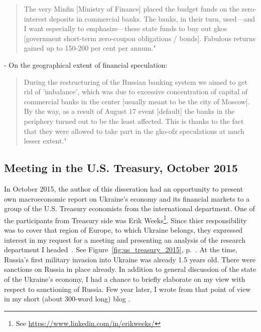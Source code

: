 \begin{quote}
The very Minfin [Ministry of Finance] placed the budget funds on the zero-interest deposits in commercial banks. The banks, in their turn, used---and I want especially to emphasize---these state funds to buy out \acp{gko} [government short-term zero-coupon obligations / bonds]. Fabulous returns gained up to 150-200 per cent per annum." \citep[p.~27]{primakov2002}
\end{quote}

- On the geographical extent of financial speculation:

\begin{quote}
During the restructuring of the Russian banking system we aimed to get rid of 'imbalance', which was due to excessive concentration of capital of commercial banks in the center [usually meant to be the city of Moscow]. By the way, as a result of August 17 event [default] the banks in the periphery turned out to be the least affected. This is thanks to the fact that they were allowed to take part in the \ac{gko}-\ac{ofz} speculations at much lesser extent." \citep[p.~53]{primakov2002}
\end{quote}

\subsection{Meeting in the U.S. Treasury, October 2015}

In October 2015, the author of this disseration had an opportunity to present own macroeconomic report on Ukraine's economy and its financial markets to a group of the U.S. Treasury economists from the international department. One of the participants from Treasury side was Erik Weeks\footnote{See {\small\url{https://www.linkedin.com/in/erikweeks/}}}. Since thier responsibility was to cover that region of Europe, to which Ukraine belongs, they expressed interest in my request for a meeting and presenting an analysis of the research department I headed~\citep{valchyshen_2015_,valchyshen_2015}. See Figure~\ref{fig:us_treasury_2015}, p.~\pageref{fig:us_treasury_2015}. At the time, Russia's first military invasion into Ukraine was already 1.5 years old. There were sanctions on Russia in place already. In addition to general discussion of the state of the Ukraine's economy, I had a chance to briefly elaborate on my view with respect to sanctioning of Russia. Few year later, I wrote from that point of view in my short (about 300-word long) blog \citep[see][]{valchyshen_2018}. 

